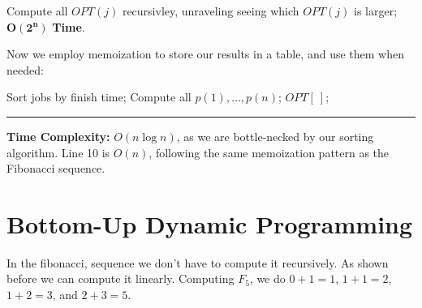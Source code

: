 \vspace{-1em}
\begin{Func}

    \vspace{-.5em}
    Compute all $OPT(j)$ recursivley, unraveling seeing which $OPT(j)$ is larger; $\mathbf{O(2^n)}$ \textbf{Time}.\\
        \begin{algorithm}[H]
            \SetAlgoLined
        \end{algorithm}
    \end{Func}

    \newpage

    \noindent
    Now we employ memoization to store our results in a table, and use them when needed:

    \begin{Func}

        \vspace{-.5em}
        \begin{algorithm}[H]
            Sort jobs by finish time; 
            Compute all $p(1),\dots,p(n)$; 
            $OPT[\ ]$; 
        \end{algorithm}
        \noindent
        \rule{\textwidth}{0.4pt}
        \textbf{Time Complexity:} $O(n\log n)$, as we are bottle-necked by our sorting algorithm. Line 10 is $O(n)$, following
        the same memoization pattern as the Fibonacci sequence.
    \end{Func}

    \vspace{-2em}
    \section{Bottom-Up Dynamic Programming}
    In the fibonacci, sequence we don't have to compute it recursively. As shown before we can compute it linearly. Computing $F_5$, we do $0+1=1$, $1+1=2$, $1+2=3$, and $2+3=5$.

